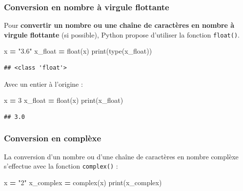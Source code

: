 \documentclass[12pt,]{book}
\newenvironment{Shaded}{\begin{snugshade}}{\end{snugshade}}
\newcommand{\DecValTok}[1]{\textcolor[rgb]{0.00,0.00,0.81}{#1}}
\newcommand{\StringTok}[1]{\textcolor[rgb]{0.31,0.60,0.02}{#1}}
\newcommand{\OperatorTok}[1]{\textcolor[rgb]{0.81,0.36,0.00}{\textbf{#1}}}
\newcommand{\BuiltInTok}[1]{#1}
\newcommand{\NormalTok}[1]{#1}
\numberwithin{equation}{section}
\numberwithin{countremarque}{section}
\begin{document}
\subsubsection{Conversion en nombre à virgule
flottante}\label{conversion-en-nombre-a-virgule-flottante}

Pour \textbf{convertir un nombre ou une chaîne de caractères en nombre à
virgule flottante} (si possible), Python propose d'utiliser la fonction
\texttt{float()}.

\begin{Shaded}
\begin{Highlighting}[]
\NormalTok{x }\OperatorTok{=} \StringTok{"3.6"}
\NormalTok{x_float }\OperatorTok{=} \BuiltInTok{float}\NormalTok{(x)}
\BuiltInTok{print}\NormalTok{(}\BuiltInTok{type}\NormalTok{(x_float))}
\end{Highlighting}
\end{Shaded}

\begin{lstlisting}
## <class 'float'>
\end{lstlisting}

Avec un entier à l'origine :

\begin{Shaded}
\begin{Highlighting}[]
\NormalTok{x }\OperatorTok{=} \DecValTok{3}
\NormalTok{x_float }\OperatorTok{=} \BuiltInTok{float}\NormalTok{(x)}
\BuiltInTok{print}\NormalTok{(x_float)}
\end{Highlighting}
\end{Shaded}

\begin{lstlisting}
## 3.0
\end{lstlisting}

\subsubsection{Conversion en complèxe}\label{conversion-en-complexe}

La conversion d'un nombre ou d'une chaîne de caractères en nombre
complèxe s'effectue avec la fonction \texttt{complex()} :

\begin{Shaded}
\begin{Highlighting}[]
\NormalTok{x }\OperatorTok{=} \StringTok{"2"}
\NormalTok{x_complex }\OperatorTok{=} \BuiltInTok{complex}\NormalTok{(x)}
\BuiltInTok{print}\NormalTok{(x_complex)}
\end{Highlighting}
\end{Shaded}
\end{document}
